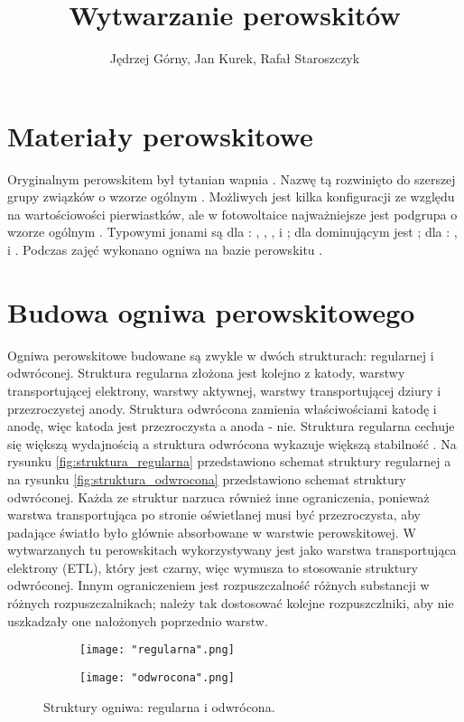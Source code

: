 \documentclass[a4, 12pt]{article}
\title{Wytwarzanie perowskitów}
\author{Jędrzej Górny, Jan Kurek, Rafał Staroszczyk}
\date{}
\begin{document}
	\maketitle
	\section{Materiały perowskitowe}
	\sloppy
	Oryginalnym perowskitem był tytanian wapnia . Nazwę tą rozwinięto do szerszej grupy związków o wzorze ogólnym . Możliwych jest kilka konfiguracji ze względu na wartościowości pierwiastków, ale w fotowoltaice najważniejsze jest podgrupa o wzorze ogólnym . Typowymi jonami są dla : , , ,  i ; dla  dominującym jest ; dla : ,  i . Podczas zajęć wykonano ogniwa na bazie perowskitu \linebreak {}.
	
	\section{Budowa ogniwa perowskitowego}
	Ogniwa perowskitowe budowane są zwykle w dwóch strukturach: regularnej i odwróconej. Struktura regularna złożona jest kolejno z katody, warstwy transportującej elektrony, warstwy aktywnej, warstwy transportującej dziury i przezroczystej anody. Struktura odwrócona zamienia właściwościami katodę i anodę, więc katoda jest przezroczysta a anoda - nie. Struktura regularna cechuje się większą wydajnością a struktura odwrócona wykazuje większą stabilność \cite{wyklad_9}. Na rysunku \ref{fig:struktura_regularna} przedstawiono schemat struktury regularnej a na rysunku \ref{fig:struktura_odwrocona} przedstawiono schemat struktury odwróconej. Każda ze struktur narzuca również inne ograniczenia, ponieważ warstwa transportująca po stronie oświetlanej musi być przezroczysta, aby padające światło było głównie absorbowane w warstwie perowskitowej. W wytwarzanych tu perowskitach wykorzystywany jest  jako warstwa transportująca elektrony (ETL), który jest czarny, więc wymusza to stosowanie struktury odwróconej. Innym ograniczeniem jest rozpuszczalność różnych substancji w różnych rozpuszczalnikach; należy tak dostosować kolejne rozpuszczlniki, aby nie uszkadzały one nałożonych poprzednio warstw. 
	\begin{figure}[H]
		\centering
		\begin{subfigure}{0.45\textwidth}
			\centering
			\texttt{[image: "regularna".png]}
		\end{subfigure}
		\begin{subfigure}{0.45\textwidth}
			\centering
			\texttt{[image: "odwrocona".png]}
		\end{subfigure}
		\captionsetup{subrefformat=parens}
		\caption{Struktury ogniwa:  regularna i  odwrócona.}
	\end{figure}
	
\end{document}
